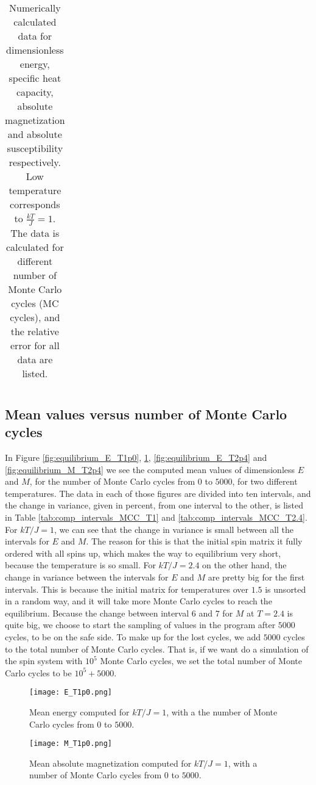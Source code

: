 \documentclass[12pt]{article}
\begin{document}
\begin{flushleft}
\begin{table}[!h]
\begin{center}
\begin{tabular}{| c | c | c || c | c | c |}
  \hline
\end{tabular}
\end{center}
\caption{\label{tab:numeric_low_T}Numerically calculated data for dimensionless energy, specific heat capacity, absolute magnetization and absolute susceptibility respectively. Low temperature corresponds to $\frac{kT}{J} = 1$. The data is calculated for different number of Monte Carlo cycles (MC cycles), and the relative error for all data are listed.}
\end{table}


\subsection{Mean values versus number of Monte Carlo cycles}
In Figure \ref{fig:equilibrium_E_T1p0}, \ref{fig:equilibrium_M_T1p0}, \ref{fig:equilibrium_E_T2p4} and \ref{fig:equilibrium_M_T2p4} we see the computed mean values of dimensionless $E$ and $M$, for the number of Monte Carlo cycles from $0$ to $5000$, for two different temperatures. The data in each of those figures are divided into ten intervals, and the change in variance, given in percent, from one interval to the other, is listed in Table \ref{tab:comp_intervals_MCC_T1} and \ref{tab:comp_intervals_MCC_T2.4}. For $kT/J = 1$, we can see that the change in variance is small between all the intervals for $E$ and $M$. The reason for this is that the initial spin matrix it fully ordered with all spins up, which makes the way to equilibrium very short, because the temperature is so small. For $kT/J = 2.4$ on the other hand, the change in variance between the intervals for $E$ and $M$ are pretty big for the first intervals. This is because the initial matrix for temperatures over $1.5$ is unsorted in a random way, and it will take more Monte Carlo cycles to reach the equilibrium. Because the change between interval $6$ and $7$ for $M$ at $T=2.4$ is quite big, we choose to start the sampling of values in the program after $5000$ cycles, to be on the safe side. To make up for the lost cycles, we add $5000$ cycles to the total number of Monte Carlo cycles. That is, if we want do a simulation of the spin system with $10^5$ Monte Carlo cycles, we set the total number of Monte Carlo cycles to be $10^5+5000$.

\begin{figure}[!h]
\centering
\begin{minipage}[b]{0.45\linewidth}
    \texttt{[image: E\_T1p0.png]}
  \caption{\label{fig:equilibrium_E_T1p0}Mean energy computed for $kT/J = 1$, with a the number of Monte Carlo cycles from $0$ to $5000$.}
\end{minipage}
\quad
\begin{minipage}[b]{0.45\linewidth}
    \texttt{[image: M\_T1p0.png]}
  \caption{Mean absolute magnetization computed for $kT/J = 1$, with a number of Monte Carlo cycles from $0$ to $5000$.}
  \label{fig:equilibrium_M_T1p0}
\end{minipage}
\end{figure}


\end{flushleft}
\end{document}
